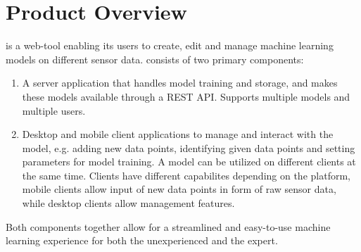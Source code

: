 \section{Product Overview}

 {\pseProjectName} is a web-tool enabling its users to create, edit and manage machine learning models on different sensor data. {\pseProjectName} consists of two primary components:

\begin{enumerate}
    \item A server application that handles model training and storage, and makes these models available through a REST API. Supports multiple models and multiple users.
    \item Desktop and mobile client applications to manage and interact with the model, e.g. adding new data points, identifying given data points and setting parameters for model training. A model can be utilized on different clients at the same time. Clients have different capabilites depending on the platform, mobile clients allow input of new data points in form of raw sensor data, while desktop clients allow management features.
\end{enumerate}

Both components together allow for a streamlined and easy-to-use machine learning experience for both the unexperienced and the expert.

